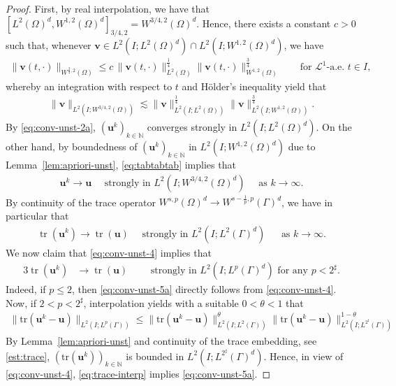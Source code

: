 \documentclass[reqno,a4paper]{amsart}
\def\vec#1{\boldsymbol{#1}}
\def\tr{\mathop{\mathrm{tr}}\nolimits}
\def\bu{\vec{u}}
\def\bv{\vec{v}}
\begin{document}
\begin{proof}
 First, by real interpolation, we have that
	$[L^2(\Omega)^{d},W^{1,2}(\Omega)^{d}]_{3/4,2} = W^{3/4,2}(\Omega)^{d}$. 
 Hence, there exists a constant $c>0$ such that, whenever $\bv\in L^{2}(I;L^{2}(\Omega)^{d})\cap L^{2}(I;W^{1,2}(\Omega)^{d})$,
	we have 
	\begin{align*}
		\|\bv(t,\cdot)\|_{W^{\frac{3}{4},2}(\Omega)} \leq c\,\|\bv(t,\cdot)\|_{L^{2}(\Omega)}^{\frac{1}{4}}\|\bv(t,\cdot)\|_{W^{1,2}(\Omega)}^{\frac{3}{4}}\qquad\text{for $\mathcal{L}^{1}$-a.e. $t\in I$}, 
	\end{align*}
	whereby an integration with respect to $t$ and H\"{o}lder's inequality yield that 
	\begin{align}\label{eq:tabtabtab}
		\|\bv\|_{L^{2}(I;W^{3/4,2}(\Omega))} \lesssim \|\bv\|_{L^{2}(I;L^{2}(\Omega))}^{\frac{1}{4}}\|\bv\|_{L^{2}(I;W^{1,2}(\Omega))}^{\frac{3}{4}}. 
	\end{align}
	By \eqref{eq:conv-unst-2a}, $(\bu^k)_{k \in \mathbb{N}}$ converges strongly in $L^2(I;L^2(\Omega)^d)$. On the other hand,  by boundedness of $(\bu^k)_{k \in \mathbb{N}}$ in $L^2(I;W^{1,2}(\Omega)^d)$ due to Lemma~\ref{lem:apriori-unst}, \eqref{eq:tabtabtab} implies that  
	\begin{align}\label{eq:conv-unst-3}		
		\bu^k \to \bu \quad \text{ strongly in }  L^2(I;W^{3/4,2}(\Omega)^d) \quad \text{ as } k \to \infty. 
	\end{align}
	By continuity of the trace operator $W^{s,p}(\Omega)^{d} \to W^{s-\frac{1}{p},p}(\Gamma)^{d}$, we have in particular that  
	\begin{align}\label{eq:conv-unst-4}
		\tr(\bu^k) \to \tr(\bu) \quad \text{ strongly in } L^2(I;L^2(\Gamma)^d)\; \quad \text{ as } k \to \infty. 
	\end{align}
	We now claim that \eqref{eq:conv-unst-4} implies that 
	\begin{alignat}{3}\label{eq:conv-unst-5a}
		\tr (\bu^k) &\to \tr(\bu) \qquad \text{ strongly in } L^2(I;L^p(\Gamma)^d) 
		\text{ for any }  p < 2^\sharp. 
	\end{alignat}
	Indeed, if $p\leq 2$, then \eqref{eq:conv-unst-5a} directly follows from \eqref{eq:conv-unst-4}. Now, if $2<p<2^{\sharp}$, 
	interpolation yields with a suitable $0<\theta<1$ that 
	\begin{align}\label{eq:trace-interp}
		\|\mathrm{tr}(\bu^{k}-\bu)\|_{L^{2}(I;L^{p}(\Gamma))} \leq \|\mathrm{tr}(\bu^{k}-\bu)\|_{L^{2}(I;L^{2}(\Gamma))}^{{\theta}}\|\mathrm{tr}(\bu^{k}-\bu)\|_{L^{2}(I;L^{2^{\sharp}}(\Gamma))}^{1-\theta}
	\end{align}
	By Lemma~\ref{lem:apriori-unst} and continuity of the trace embedding, see \eqref{est:trace}, $(\mathrm{tr}(\bu^{k}))_{k\in\mathbb{N}}$ is bounded in $L^{2}(I;L^{2^{\sharp}}(\Gamma)^{d})$. Hence, in view of \eqref{eq:conv-unst-4}, \eqref{eq:trace-interp} implies \eqref{eq:conv-unst-5a}. 
	

\end{proof}
\end{document}

